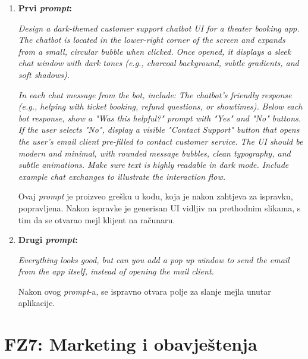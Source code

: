 \begin{enumerate}[itemsep=1ex]
    \item \textbf{Prvi \textit{prompt}:}

    \textit{
    Design a dark-themed customer support chatbot UI for a theater booking app. The chatbot is located in the lower-right corner of the screen and expands from a small, circular bubble when clicked. Once opened, it displays a sleek chat window with dark tones (e.g., charcoal background, subtle gradients, and soft shadows).}

    \textit{In each chat message from the bot, include:
    }
    \textit{The chatbot’s friendly response (e.g., helping with ticket booking, refund questions, or showtimes).
    }
    \textit{Below each bot response, show a "Was this helpful?" prompt with "Yes" and "No" buttons.
    }
    \textit{If the user selects "No", display a visible "Contact Support" button that opens the user's email client pre-filled to contact customer service.
    }
    \textit{The UI should be modern and minimal, with rounded message bubbles, clean typography, and subtle animations. Make sure text is highly readable in dark mode. Include example chat exchanges to illustrate the interaction flow.}

    Ovaj \textit{prompt} je proizveo grešku u kodu, koja je nakon zahtjeva za ispravku, popravljena. Nakon ispravke je generisan UI vidljiv na prethodnim slikama, s tim da se otvarao mejl klijent na računaru.

    \item \textbf{Drugi \textit{prompt}:}

    \textit{Everything looks good, but can you add a pop up window to send the email from the app itself, instead of opening the mail client.}

    Nakon ovog \textit{prompt}-a, se ispravno otvara polje za slanje mejla unutar aplikacije.    
\end{enumerate}
\pagebreak

\sloppy  
\section{FZ7: Marketing i obavještenja}  

\sloppy  
